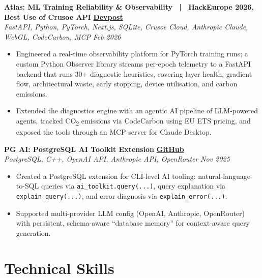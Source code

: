\documentclass[10pt,letterpaper]{article}
\newcommand{\resumeHeading}[4]{
    {\textbf{#1} \hfill \textbf{#2}} \\[0.5pt]
    {\textit{#3} \hfill \textit{#4}}
}
\begin{document}
\resumeHeading
{Atlas: ML Training Reliability \& Observability ~|~ HackEurope 2026, Best Use of Crusoe API}{\href{https://devpost.com/software/atlas-3z6s2y}{Devpost}}
{FastAPI, Python, PyTorch, Next.js, SQLite, Crusoe Cloud, Anthropic Claude, WebGL, CodeCarbon, MCP}{Feb 2026}
\begin{itemize}
    \item Engineered a real-time observability platform for PyTorch training runs; a custom Python Observer library streams per-epoch telemetry to a FastAPI backend that runs 30+ diagnostic heuristics, covering layer health, gradient flow, architectural waste, early stopping, device utilisation, and carbon emissions.
    \item Extended the diagnostics engine with an agentic AI pipeline of LLM-powered agents, tracked CO\textsubscript{2} emissions via CodeCarbon using EU ETS pricing, and exposed the tools through an MCP server for Claude Desktop.
\end{itemize}

\resumeHeading
{PG AI: PostgreSQL AI Toolkit Extension}{\href{https://github.com/AjinkyaTaranekar/ai_toolkit}{GitHub}}
{PostgreSQL, C++, OpenAI API, Anthropic API, OpenRouter}{Nov 2025}
\begin{itemize}
    \item Created a PostgreSQL extension for CLI-level AI tooling: natural-language-to-SQL queries via \texttt{ai\_toolkit.query(...)}, query explanation via \texttt{explain\_query(...)}, and error diagnosis via \texttt{explain\_error(...)}.
    \item Supported multi-provider LLM config (OpenAI, Anthropic, OpenRouter) with persistent, schema-aware ``database memory'' for context-aware query generation.
\end{itemize}

\section{Technical Skills}
\end{document}
